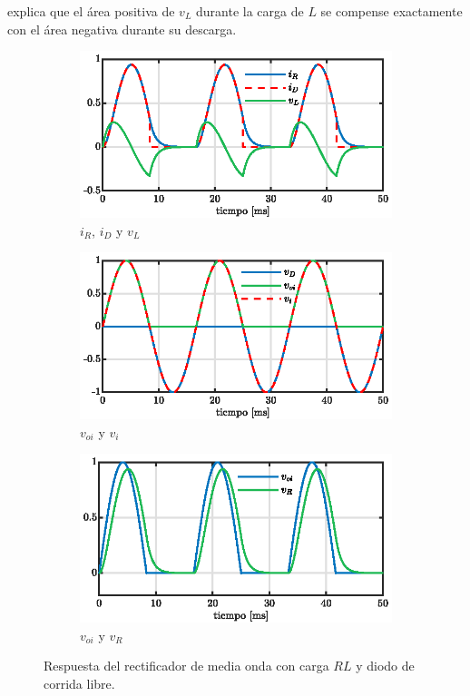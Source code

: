 \documentclass[conference]{IEEEtran}
\begin{document}
explica que el área positiva de $v_L$ durante la carga de $L$ se compense exactamente con el área negativa durante su descarga.

\begin{figure}[ht]
  \centering
  \begin{subfigure}[t]{0.5\textwidth}
    \centering
    \includegraphics[width=\linewidth]{figuras/ir_id_vl.eps}
    \caption{$i_R$, $i_D$ y $v_L$}
    \label{fig:ir-id-vl}
  \end{subfigure}\hfill
  \begin{subfigure}[t]{0.5\textwidth}
    \centering
    \includegraphics[width=\linewidth]{figuras/voi_vi.eps}
    \caption{$v_{oi}$ y $v_i$}
    \label{fig:voi-vi}
  \end{subfigure}\hfill
  \begin{subfigure}[t]{0.5\textwidth}
    \centering
    \includegraphics[width=\linewidth]{figuras/voi_vr.eps}
    \caption{$v_{oi}$ y $v_R$}
    \label{fig:voi-vr}
  \end{subfigure}
  \caption{Respuesta del rectificador de media onda con carga $RL$ y diodo de corrida libre.}
  \label{fig:rectificador-subfigs}
\end{figure}
\end{document}
